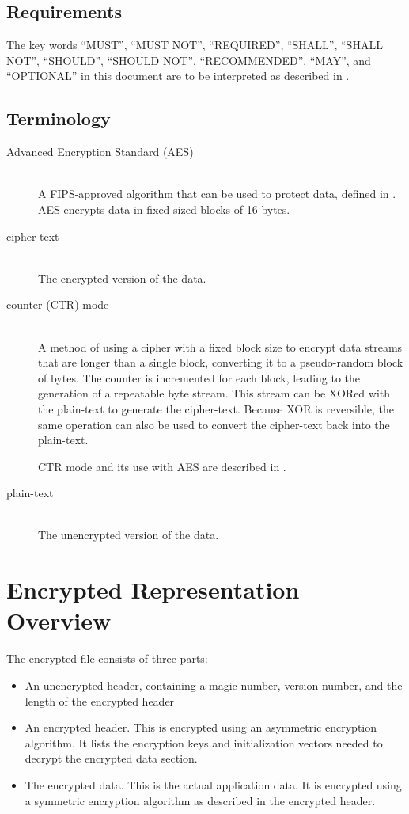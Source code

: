 \documentclass[10pt]{article}
\begin{document}
\subsection{Requirements}
The key words ``MUST'', ``MUST NOT'', ``REQUIRED'', ``SHALL'', ``SHALL NOT'', ``SHOULD'', ``SHOULD NOT'',
``RECOMMENDED'', ``MAY'', and ``OPTIONAL'' in this document are to be interpreted as described in \cite{RFC2119}.

\subsection{Terminology}
\begin{description}
\item[Advanced Encryption Standard (AES)]~\\
A FIPS-approved algorithm that can be used to protect data, defined in
\cite{AESSTD}.
AES encrypts data in fixed-sized blocks of 16 bytes.

\item[cipher-text]~\\
The encrypted version of the data.

\item[counter (CTR) mode]~\\
A method of using a cipher with a fixed block size to encrypt data streams that are longer than a single block,
converting it to a pseudo-random block of bytes.
The counter is incremented for each block, leading to the generation of a repeatable byte stream.
This stream can be XORed with the plain-text to generate the cipher-text.
Because XOR is reversible, the same operation can also be used to convert the cipher-text back into the plain-text.

CTR mode and its use with AES are described in \cite{CTRMODE}.

\item[plain-text]~\\
The unencrypted version of the data.
 
\end{description}

\section{Encrypted Representation Overview}
The encrypted file consists of three parts:

\begin{itemize}
\item An unencrypted header, containing a magic number, version number, and the length of the encrypted header

\item An encrypted header.  This is encrypted using an asymmetric encryption algorithm.
It lists the encryption keys and initialization vectors needed to decrypt the encrypted data section.

\item The encrypted data.
This is the actual application data.
It is encrypted using a symmetric encryption algorithm as described in the encrypted header.
\end{itemize}
\end{document}
